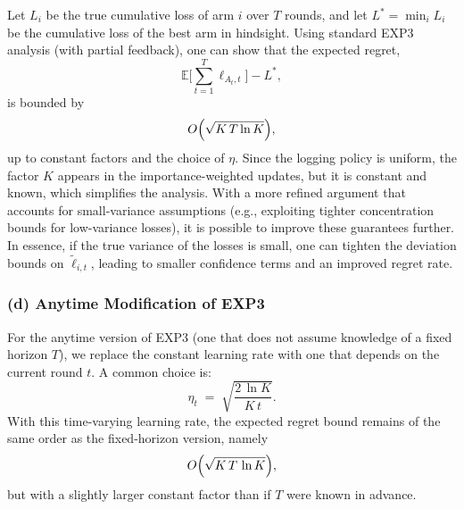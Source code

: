 Let $L_i$ be the true cumulative loss of arm $i$ over $T$ rounds, and let $L^* = \min_i L_i$ be the cumulative loss of the best arm in hindsight. 
Using standard EXP3 analysis (with partial feedback), one can show that the expected regret, 
\[
    \mathbb{E}\bigl[\sum_{t=1}^T \ell_{A_t,t}\bigr] - L^*,
\]
is bounded by 
\[
    O\Bigl(\sqrt{K\,T \ln K}\Bigr),
\]
up to constant factors and the choice of $\eta$. 
Since the logging policy is uniform, the factor $K$ appears in the importance-weighted updates, 
but it is constant and known, which simplifies the analysis. 
With a more refined argument that accounts for small-variance assumptions (e.g., exploiting tighter concentration bounds for low-variance losses), 
it is possible to improve these guarantees further. 
In essence, if the true variance of the losses is small, one can tighten the deviation bounds on $\tilde{\ell}_{i,t}$, 
leading to smaller confidence terms and an improved regret rate.

\noindent
\subsubsection*{(d) Anytime Modification of EXP3}

\smallskip
For the anytime version of EXP3 (one that does not assume knowledge of a fixed horizon $T$), 
we replace the constant learning rate with one that depends on the current round $t$. 
A common choice is:
\[
    \eta_t \;=\; \sqrt{\frac{2\,\ln K}{K\,t}}.
\]
With this time-varying learning rate, the expected regret bound remains of the same order as the fixed-horizon version, namely
\[
    O\Bigl(\sqrt{K\,T\,\ln K}\Bigr),
\]
but with a slightly larger constant factor than if $T$ were known in advance.